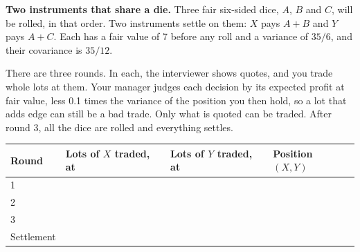 \begin{question}\label{iq:iv2:played-games:6}
\textbf{Two instruments that share a die.} Three fair six-sided dice, $A$, $B$ and $C$, will be rolled, in that order. Two instruments settle on them: $X$ pays $A + B$ and $Y$ pays $A + C$. Each has a fair value of 7 before any roll and a variance of $35/6$, and their covariance is $35/12$.

There are three rounds. In each, the interviewer shows quotes, and you trade whole lots at them. Your manager judges each decision by its expected profit at fair value, less 0.1 times the variance of the position you then hold, so a lot that adds edge can still be a bad trade. Only what is quoted can be traded. After round 3, all the dice are rolled and everything settles.

\medskip
\begin{tabular}{@{}l|l|l|l@{}}
Round & Lots of $X$ traded, at & Lots of $Y$ traded, at & Position $(X, Y)$ \\ \hline
1 & & & \\[8pt]\hline
2 & & & \\[8pt]\hline
3 & & & \\[8pt]\hline
Settlement & & & \\[8pt]\hline
\end{tabular}
\end{question}
\vfill\clearpage

